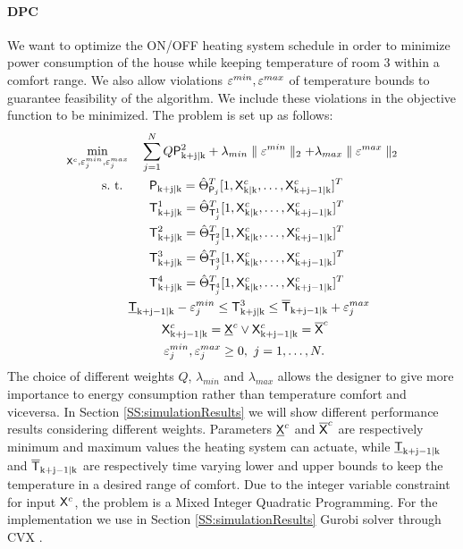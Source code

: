 \paragraph{DPC}
We want to optimize the ON/OFF heating system schedule in order to minimize power consumption of the house while keeping temperature of room $3$ within a comfort range. We also allow violations $\varepsilon^{min},\varepsilon^{max}$  of temperature bounds to guarantee feasibility of the algorithm. We include these violations in the objective function to be minimized. The problem is set up as follows:
\begin{align}
	\begin{aligned}
		\min_{\tX^c,\eps_j^{min},\eps_j^{max}} & \ \ \ \sum_{j=1}^{N} Q{\tP}_{\mathrm{k+j|k}}^2 +  \lambda_{min}\parallel\eps^{min}\parallel_2 + \lambda_{max}\parallel\eps^{max}\parallel_2 \\
		\text{s.~t. }& \ \ \ \ \ {\tP}_{\mathrm{k+j|k}} =  \hat{\Theta}^{T}_{\tP_j} [ 1,\tX^c_{\mathrm{k|k}},\dots,\tX^c_{\mathrm{k+j-1|k}} ]^T \\
					 & \ \ \ \ \ \tT^1_{\mathrm{k+j|k}} =  \hat{\Theta}^{T}_{\tT^1_j} [ 1,\tX^c_{\mathrm{k|k}},\dots,\tX^c_{\mathrm{k+j-1|k}} ]^T \\
					 & \ \ \ \ \ \tT^2_{\mathrm{k+j|k}} =  \hat{\Theta}^{T}_{\tT^2_j} [ 1,\tX^c_{\mathrm{k|k}},\dots,\tX^c_{\mathrm{k+j-1|k}} ]^T \\
			 	 	 & \ \ \ \ \ \tT^3_{\mathrm{k+j|k}} =  \hat{\Theta}^{T}_{\tT^3_j} [ 1,\tX^c_{\mathrm{k|k}},\dots,\tX^c_{\mathrm{k+j-1|k}} ]^T \\
				 	 & \ \ \ \ \ \tT^4_{\mathrm{k+j|k}} =  \hat{\Theta}^{T}_{\tT^4_j} [ 1,\tX^c_{\mathrm{k|k}},\dots,\tX^c_{\mathrm{k+j-1|k}} ]^T \\					
					 & \underline{\tT}_{\mathrm{k+j-1|k}}-\eps^{min}_j \leq \tT^3_{\mathrm{k+j|k}} \leq \overline{\tT}_{\mathrm{k+j-1|k}} + \eps^{max}_j\\
					 & \ \ \ \ \ \ \ \ \tX^c_{\mathrm{k+j-1|k}} = \underline{\tX}^c \lor \tX^c_{\mathrm{k+j-1|k}} = \overline{\tX}^c\\ 
					 & \ \ \ \ \ \ \ \ \,\eps^{min}_j,\eps^{max}_j \geq 0, \ j = 1,\dots,N.
	\end{aligned}
	\label{E:DPCrealcase}
\end{align}
The choice of different weights $Q$, $\lambda_{min}$ and $\lambda_{max}$ allows the designer to give more importance to energy consumption rather than temperature comfort and viceversa. In Section \ref{SS:simulationResults} we will show different performance results considering different weights. Parameters $\underline{\mathsf{X}}^c$ and $\overline{\mathsf{X}}^c$ are respectively minimum and maximum values the heating system can actuate, while $\underline{\mathsf{T}}_{\mathrm{k+j-1|k}}$ and $\overline{\mathsf{T}}_{\mathrm{k+j-1|k}}$ are respectively time varying lower and upper bounds to keep the temperature in a desired range of comfort. Due to the integer variable constraint for input $\mathsf{X}^c$, the problem is a Mixed Integer Quadratic Programming. For the implementation we use in Section \ref{SS:simulationResults} Gurobi solver \cite{Gurobi2015} through CVX \cite{cvx,gb08}.

